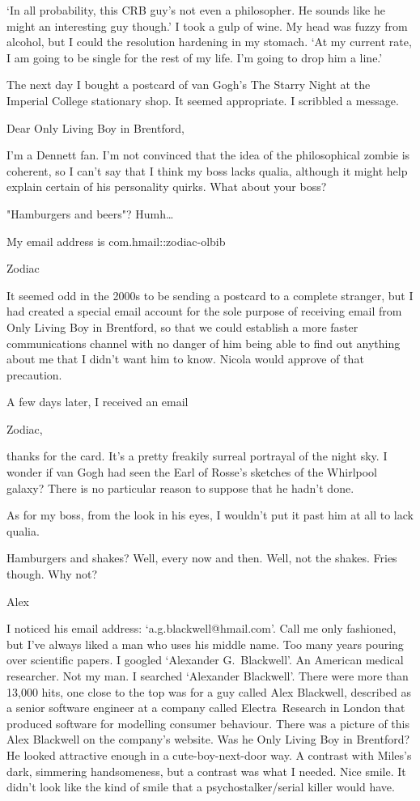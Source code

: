 `In all probability, this {\twelvesl CRB\/} guy's not even a philosopher. He sounds like he
might an interesting guy though.' I took a gulp of wine. My head was
fuzzy from alcohol, but I could the resolution hardening in my
stomach. `At my current rate, I am going to be single for the rest of my
life. I'm going to drop him a line.'

The next day I bought a postcard of van Gogh's {\twelvesl The Starry
Night\/} at the Imperial College stationary shop. It seemed
appropriate. I scribbled a message.
\vskip 12pt
{\twelvett\obeylines

Dear Only Living Boy in Brentford,

I'm a Dennett fan. I'm not convinced that the idea of the
philosophical zombie is coherent, so I can't say that I think my
boss lacks qualia, although it might help explain certain of his
personality quirks. What about your boss?

"Hamburgers and beers"? Humh\dots

My email address is com.hmail::zodiac-olbib

Zodiac}
\vskip 12pt
It seemed odd in the 2000s to be sending a postcard to a complete
stranger, but I had created a special email account for the sole
purpose of receiving email from Only Living Boy in Brentford, so
that we could establish a more faster communications channel with no
danger of him being able to find out anything about me that I didn't
want him to know. Nicola would approve of that precaution.

A few days later, I received an email

{\twelvett\obeylines

Zodiac,

thanks for the card. It's a pretty freakily surreal portrayal of the
night sky. I wonder if van Gogh had seen the Earl of Rosse's
sketches of the Whirlpool galaxy? There is no particular reason to
suppose that he hadn't done.

As for my boss, from the look in his eyes, I wouldn't put it past
him at all to lack qualia.

Hamburgers and shakes? Well, every now and then. Well, not the shakes. Fries though. Why not?

Alex}

I noticed his email address: {\twelvett `a.g.blackwell@hmail.com'}.
Call me only fashioned, but I've always liked a man who uses his
middle name. Too many years pouring over scientific papers. I
googled `Alexander G.~Blackwell'. An American medical researcher.
Not my man. I searched `Alexander Blackwell'. There were more than
13,000 hits, one close to the top was for a guy called Alex
Blackwell, described as a senior software engineer at a company
called Electra~Research in London that produced software for
modelling consumer behaviour. There was a picture of this Alex
Blackwell on the company's website. Was he Only Living Boy in
Brentford? He looked attractive enough in a cute-boy-next-door way.
A contrast with Miles's dark, simmering handsomeness, but a contrast
was what I needed. Nice smile. It didn't look like the kind of smile
that a psychostalker/serial killer would have.


